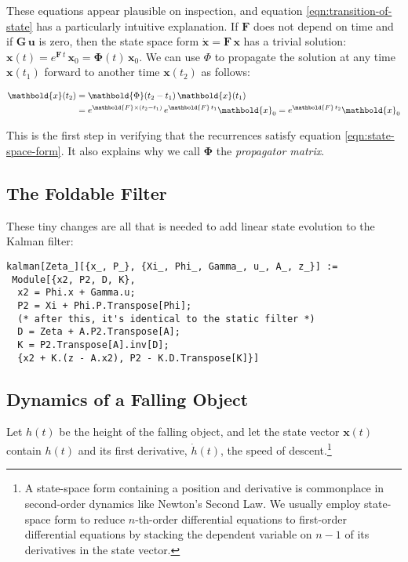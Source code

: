 \documentclass[10pt,oneside,x11names]{article}
\begin{document}
These equations appear plausible on inspection, and equation
\ref{eqn:transition-of-state} has a particularly intuitive explanation. If
\(\mathbold{F}\) does not depend on time and if \(\mathbold{G}\,\mathbold{u}\) is
zero, then the state space form \(\dot{\mathbold{x}}=\mathbold{F}\,\mathbold{x}\)
has a trivial solution:
\(\mathbold{x}(t)=e^{\mathbold{F}\,t}\,\mathbold{x}_0=\mathbold{\Phi}(t)\,\mathbold{x}_0\). We can use \(\Phi\) to
propagate the solution at any time \(\mathbold{x}(t_1)\) forward to another time
\(\mathbold{x}(t_2)\) as follows:

\begin{align}
\mathbold{x}(t_2)&=\mathbold{\Phi}(t_2-t_1)\,\mathbold{x}(t_1) \\
\notag
&=e^{\mathbold{F}\times(t_2-t_1)}\,e^{\mathbold{F}\,t_1}\mathbold{x}_0=e^{\mathbold{F}\,t_2}\mathbold{x}_0
\end{align}

\noindent This is the first step in verifying that the recurrences satisfy
equation \ref{eqn:state-space-form}. It also explains why we call
\(\mathbold{\Phi}\) the \emph{propagator matrix}.

\subsection{The Foldable Filter}
\label{sec:org666b374}

These tiny changes are all that is needed to add linear state evolution to the Kalman
filter:

\begin{verbatim}
kalman[Zeta_][{x_, P_}, {Xi_, Phi_, Gamma_, u_, A_, z_}] :=
 Module[{x2, P2, D, K},
  x2 = Phi.x + Gamma.u;
  P2 = Xi + Phi.P.Transpose[Phi];
  (* after this, it's identical to the static filter *)
  D = Zeta + A.P2.Transpose[A];
  K = P2.Transpose[A].inv[D];
  {x2 + K.(z - A.x2), P2 - K.D.Transpose[K]}]\end{verbatim}

\subsection{Dynamics of a Falling Object}
\label{sec:org3601cc3}

Let \(h(t)\) be the height of
the falling object, and let the state vector \(\mathbold{x}(t)\) contain \(h(t)\)
and its first derivative, \(\dot{h}(t)\), the speed of descent.\footnote{A state-space form containing a position and derivative is commonplace
in second-order dynamics like Newton's Second Law. We usually employ state-space
form to reduce \(n\)-th-order differential equations to first-order differential
equations by stacking the dependent variable on \(n-1\) of its derivatives in the
state vector.}
\end{document}
